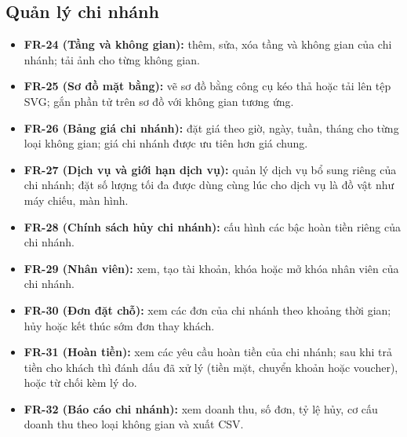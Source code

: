 \subsection{Quản lý chi nhánh}
\begin{itemize}
    \item \textbf{FR-24 (Tầng và không gian):} thêm, sửa, xóa tầng và không gian của chi nhánh; tải ảnh cho từng không gian.
    \item \textbf{FR-25 (Sơ đồ mặt bằng):} vẽ sơ đồ bằng công cụ kéo thả hoặc tải lên tệp SVG; gắn phần tử trên sơ đồ với không gian tương ứng.
    \item \textbf{FR-26 (Bảng giá chi nhánh):} đặt giá theo giờ, ngày, tuần, tháng cho từng loại không gian; giá chi nhánh được ưu tiên hơn giá chung.
    \item \textbf{FR-27 (Dịch vụ và giới hạn dịch vụ):} quản lý dịch vụ bổ sung riêng của chi nhánh; đặt số lượng tối đa được dùng cùng lúc cho dịch vụ là đồ vật như máy chiếu, màn hình.
    \item \textbf{FR-28 (Chính sách hủy chi nhánh):} cấu hình các bậc hoàn tiền riêng của chi nhánh.
    \item \textbf{FR-29 (Nhân viên):} xem, tạo tài khoản, khóa hoặc mở khóa nhân viên của chi nhánh.
    \item \textbf{FR-30 (Đơn đặt chỗ):} xem các đơn của chi nhánh theo khoảng thời gian; hủy hoặc kết thúc sớm đơn thay khách.
    \item \textbf{FR-31 (Hoàn tiền):} xem các yêu cầu hoàn tiền của chi nhánh; sau khi trả tiền cho khách thì đánh dấu đã xử lý (tiền mặt, chuyển khoản hoặc voucher), hoặc từ chối kèm lý do.
    \item \textbf{FR-32 (Báo cáo chi nhánh):} xem doanh thu, số đơn, tỷ lệ hủy, cơ cấu doanh thu theo loại không gian và xuất CSV.
\end{itemize}

